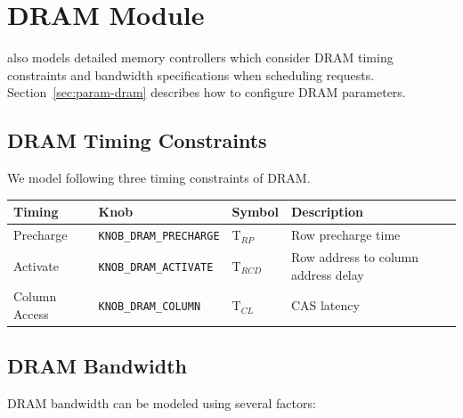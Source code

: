 \section{DRAM Module} 
\label{sec:dram}

\SIM also models detailed memory controllers which consider DRAM
timing constraints and bandwidth specifications when scheduling
requests. Section~\ref{sec:param-dram} describes how to configure
DRAM parameters.

\subsection{DRAM Timing Constraints}

We model following three timing constraints of DRAM.

\vspace{0.2in}
\begin{center}
\begin{footnotesize}
\begin{tabular}{l l l l}
Timing              & Knob      				 & Symbol    & Description                         \\ \hline \hline
Precharge     		& \Verb+KNOB_DRAM_PRECHARGE+ & T$_{RP}$  & Row precharge time                  \\
Activate      		& \Verb+KNOB_DRAM_ACTIVATE+  & T$_{RCD}$ & Row address to column address delay \\
Column Access 		& \Verb+KNOB_DRAM_COLUMN+    & T$_{CL}$  & CAS latency                         \\
\end{tabular}
\end{footnotesize}
\end{center}

\subsection{DRAM Bandwidth}

DRAM bandwidth can be modeled using several factors:

